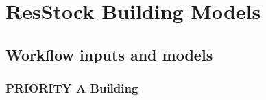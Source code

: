 \chapter{ResStock Building Models}






\section{Workflow inputs and models}\label{build_models_workflow}



\subsection{PRIORITY A Building}
